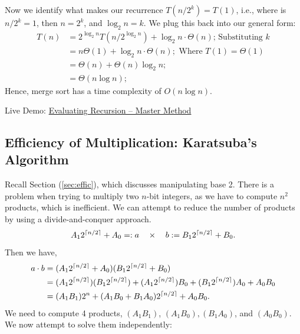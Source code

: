 \begin{Proof}
\vspace{-1.5em}
\noindent
Now we identify what makes our recurrence $T(n/2^k) = T(1)$, i.e., where is $n/2^k = 1$, then $n=2^k$, and $\log_2 n = k$. We plug this back into our general form:
\begin{align*}
    T(n) &= 2^{\log_2 n}T(n/2^{\log_2 n}) + \log_2 n\cdot \Theta(n)\text{; Substituting $k$}\\
    &= n\Theta(1) + \log_2 n\cdot\Theta(n);\text{ Where $T(1)=\Theta(1)$}\\
    &= \Theta(n) + \Theta(n)\log_2 n;\\
    &= \Theta(n\log n);
\end{align*}
Hence, merge sort has a time complexity of $O(n\log n)$.
\end{Proof}
\begin{Tip}
    Live Demo: \href{https://youtu.be/AJmDcuU42JY?t=2526}{Evaluating Recursion -- Master Method}
\end{Tip}

\newpage 

\noindent

\subsection{Efficiency of Multiplication: Karatsuba's Algorithm}
Recall Section (\ref{sec:effic}), which discusses manipulating base 2. There is a problem when trying to 
multiply two $n$-bit integers, as we have to compute $n^2$ products, which is inefficient. We can attempt to reduce the number of products by using a divide-and-conquer approach.\\
\[A_1 2^{\lceil n/2\rceil}+A_0=:a \quad \times \quad b:= B_1 2^{\lceil n/2\rceil}+B_0.\]
\noindent
Then we have,
\begin{align*}
    a\cdot b &=(A_1 2^{\lceil n/2\rceil}+A_0)(B_1 2^{\lceil n/2\rceil}+B_0)\\
    &=(A_1 2^{\lceil n/2\rceil})(B_1 2^{\lceil n/2\rceil})+(A_1 2^{\lceil n/2\rceil})B_0+(B_1 2^{\lceil n/2\rceil})A_0+A_0B_0\\
    &=(A_1B_1)2^{n}+(A_1B_0+B_1A_0)2^{\lceil n/2\rceil}+A_0B_0.
\end{align*}
\noindent
We need to compute 4 products, $(A_1B_1)$, $(A_1B_0), (B_1A_0)$, and $(A_0B_0)$. We now attempt to solve them independently:

